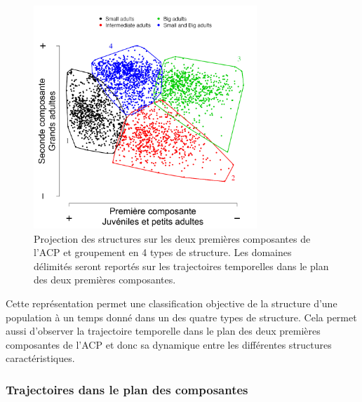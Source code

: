 \begin{figure}[!ht]
\begin{center}
\includegraphics[width=0.75\textwidth]{1_CorpsDeThese/Resumes/Fig/SP03b}
\caption[Projection des données
sur les deux premières composantes]{Projection des structures sur les deux
premières composantes de l'ACP et groupement en 4 types de structure. Les
domaines délimités seront reportés sur les trajectoires temporelles dans le
plan des deux premières composantes.}
\label{fig:SP3}
\end{center}
\end{figure}

Cette représentation permet une classification objective de la structure d'une
population à un temps donné dans un des quatre types de structure. Cela permet
aussi d'observer la trajectoire temporelle dans le plan des deux premières
composantes de l'ACP et donc sa dynamique entre les différentes structures
caractéristiques.

\subsubsection{Trajectoires dans le plan des composantes}

